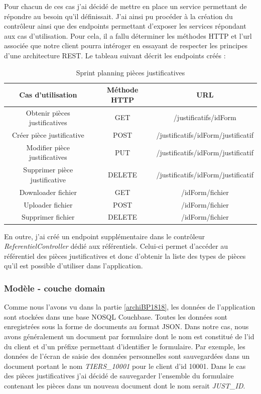 	Pour chacun de ces cas j'ai décidé de mettre en place un service permettant de répondre au besoin qu'il définissait. J'ai ainsi pu procéder à la création du contrôleur ainsi que des endpoints permettant d'exposer les services répondant aux cas d'utilisation. Pour cela, il a fallu déterminer les méthodes HTTP et l'url associée que notre client pourra intéroger en essayant de respecter les principes d'une architecture REST. Le tableau suivant décrit les endpoints créés :
	
\begin{table}[h!]
	\center
	\begin{tabular}{| c | c | c |}
     \hline
     Cas d'utilisation & Méthode HTTP & URL \\ \hline
     Obtenir pièces justificatives & GET & /justificatifs/{idForm}\\ \hline
     Créer pièce justificative & POST & /justificatifs/{idForm}/justificatif\\ \hline
     Modifier pièce justificatives & PUT & /justificatifs/{idForm}/justificatif\\ \hline
     Supprimer pièce justificative & DELETE & /justificatifs/{idForm}/justificatif\\ \hline
     Downloader fichier & GET & /{idForm}/fichier\\ \hline
     Uploader fichier & POST & /{idForm}/fichier\\ \hline
     Supprimer fichier & DELETE & /{idForm}/fichier\\ \hline
	\end{tabular}
	\caption{Sprint planning pièces justificatives}
	\label{sprintPlanningPJ}
\end{table}

	En outre, j'ai créé un endpoint supplémentaire dans le contrôleur \textit{ReferentielController} dédié aux référentiels. Celui-ci permet d'accéder au référentiel des pièces justificatives et donc d'obtenir la liste des types de pièces qu'il est possible d'utiliser dans l'application.

	\subsubsection{Modèle - couche domain}
	
	Comme nous l'avons vu dans la partie \ref{archiBP1818}, les données de l'application sont stockées dans une base NOSQL Couchbase. Toutes les données sont enregistrées sous la forme de documents au format JSON. Dans notre cas, nous avons généralement un document par formulaire dont le nom est constitué de l'id du client et d'un préfixe permettant d'identifier le formulaire. Par exemple, les données de l'écran de saisie des données personnelles sont sauvegardées dans un document portant le nom \textit{TIERS\_10001} pour le client d'id 10001. Dans le cas des pièces justificatives j'ai décidé de sauvegarder l'ensemble du formulaire contenant les pièces dans un nouveau document dont le nom serait \textit{JUST\_ID}. \\
	
